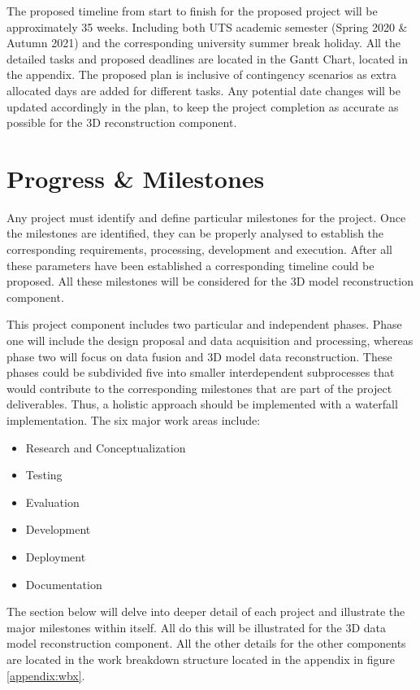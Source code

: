 \documentclass[12pt]{report}
\begin{document}
The proposed timeline from start to finish for the proposed project will be approximately  35 weeks. Including both UTS academic semester (Spring 2020 \& Autumn 2021) and the corresponding university summer break holiday.
All the detailed tasks and proposed deadlines are located in the Gantt Chart, located in the appendix.
The proposed plan is inclusive of contingency scenarios as extra allocated days are added for different tasks. Any potential date changes will be updated accordingly in the plan,  to keep the project completion as accurate as possible for the 3D reconstruction component.  

\newpage
\section{Progress \& Milestones}
Any project must identify and define particular milestones for the project. 
Once the milestones are identified, they can be properly analysed to establish the corresponding requirements, processing, development and execution. 
After all these parameters have been established a corresponding timeline could be proposed. All these milestones will be considered for the 3D model reconstruction component. 

This project component includes two particular and independent phases. 
Phase one will include the design proposal and data acquisition and processing, whereas phase two will focus on data fusion and 3D model data reconstruction.  
These phases could be subdivided five into smaller interdependent subprocesses that would contribute to the corresponding milestones that are part of the project deliverables. 
Thus, a holistic approach should be implemented with a waterfall implementation. The six major work areas include:

\begin{itemize}
  \item Research and Conceptualization
  \item Testing 
  \item Evaluation
  \item Development
  \item Deployment 
  \item Documentation
\end{itemize}

The section below will delve into deeper detail of each project and illustrate the major milestones within itself. All do this will be illustrated for the 3D data model reconstruction component. 
All the other details for the other components are located in the work breakdown structure located in the appendix in figure \ref{appendix:wbx}. 
\end{document}

